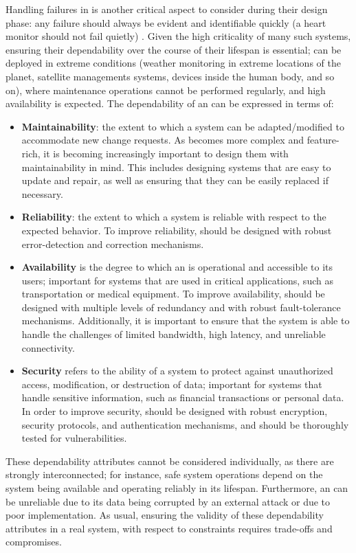 Handling failures in \ess is another critical aspect to consider during their design phase: any failure should always be evident and identifiable quickly (a heart monitor should not fail quietly) \cite{MakingEmbeddedSystems}. Given the high criticality of many such systems, ensuring their dependability over the course of their lifespan is essential; \ess can be deployed in extreme conditions (\ie weather monitoring in extreme locations of the planet, satellite managements systems, devices inside the human body, and so on), where maintenance operations cannot be performed regularly, and high availability is expected. 
The dependability of an \es can be expressed in terms of:
\begin{itemize}
    \item \textbf{Maintainability}: the extent to which a system can be adapted/modified to accommodate new change requests. As \ess becomes more complex and feature-rich, it is becoming increasingly important to design them with maintainability in mind. This includes designing systems that are easy to update and repair, as well as ensuring that they can be easily replaced if necessary.
    \item \textbf{Reliability}: the extent to which a system is reliable with respect to the expected behavior. To improve reliability, \es should be designed with robust error-detection and correction mechanisms.
    \item \textbf{Availability} is the degree to which an \es is operational and accessible to its users; important for systems that are used in critical applications, such as transportation or medical equipment. To improve availability, \ess should be designed with multiple levels of redundancy and with robust fault-tolerance mechanisms. Additionally, it is important to ensure that the system is able to handle the challenges of limited bandwidth, high latency, and unreliable connectivity.
    \item \textbf{Security} refers to the ability of a system to protect against unauthorized access, modification, or destruction of data; important for systems that handle sensitive information, such as financial transactions or personal data. In order to improve security, \ess should be designed with robust encryption, security protocols, and authentication mechanisms, and should be thoroughly tested for vulnerabilities.
\end{itemize}

These dependability attributes cannot be considered individually, as there are strongly interconnected; for instance, safe system operations depend on the system being available and operating reliably in its lifespan. Furthermore, an \es can be unreliable due to its data being corrupted by an external attack or due to poor implementation. As usual, ensuring the validity of these dependability attributes in a real system, with respect to \es constraints requires trade-offs and compromises.





